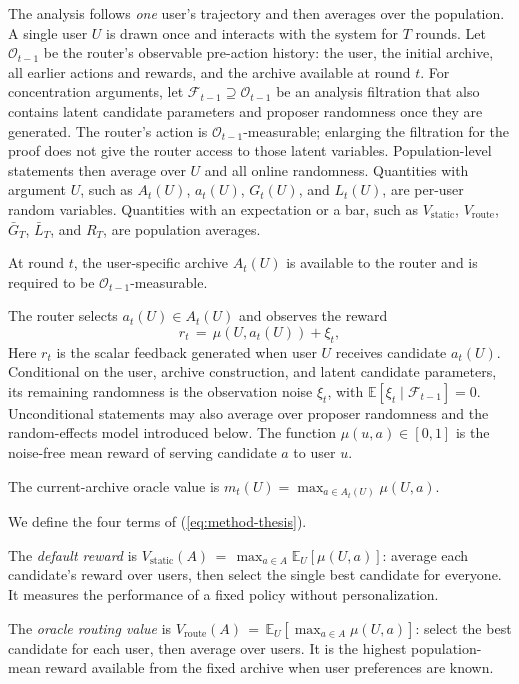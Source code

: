 \documentclass{article} %
\providecommand{\E}{\mathbb{E}}
\renewcommand{\eqref}[1]{\textup{(\ref{#1})}}
\begin{document}
The analysis follows \emph{one} user's trajectory and then averages over the population. A single user \(U\) is drawn once and interacts with the system for \(T\) rounds. Let \(\mathcal O_{t-1}\) be the router's observable pre-action history: the user, the initial archive, all earlier actions and rewards, and the archive available at round \(t\). For concentration arguments, let \(\mathcal F_{t-1}\supseteq\mathcal O_{t-1}\) be an analysis filtration that also contains latent candidate parameters and proposer randomness once they are generated. The router's action is \(\mathcal O_{t-1}\)-measurable; enlarging the filtration for the proof does not give the router access to those latent variables. Population-level statements then average over \(U\) and all online randomness. Quantities with argument \(U\), such as \(A_t(U)\), \(a_t(U)\), \(G_t(U)\), and \(L_t(U)\), are per-user random variables.  Quantities with an expectation or a bar, such as \(V_{\mathrm{static}}\), \(V_{\mathrm{route}}\), \(\bar G_T\), \(\bar L_T\), and \(R_T\), are population averages.

At round $t$, the user-specific archive $A_t(U)$ is available to the router and is required to be $\mathcal{O}_{t-1}$-measurable.

The router selects $a_t(U) \in A_t(U)$ and observes the reward
\begin{equation}
r_t \,=\, \mu(U, a_t(U)) + \xi_t ,
\end{equation}
Here \(r_t\) is the scalar feedback generated when user \(U\) receives candidate \(a_t(U)\). Conditional on the user, archive construction, and latent candidate parameters, its remaining randomness is the observation noise \(\xi_t\), with \(\E[\xi_t\mid\mathcal F_{t-1}]=0\). Unconditional statements may also average over proposer randomness and the random-effects model introduced below. The function \(\mu(u,a)\in[0,1]\) is the noise-free mean reward of serving candidate \(a\) to user \(u\).

The current-archive oracle value is $m_t(U) = \max_{a \in A_t(U)} \mu(U,a)$.

We define the four terms of \eqref{eq:method-thesis}.

The \emph{default reward} is $V_{\mathrm{static}}(A) \,=\, \max_{a \in A} \E_{U}[\mu(U,a)]$: average each candidate's reward over users, then select the single best candidate for everyone. It measures the performance of a fixed policy without personalization.

The \emph{oracle routing value} is $V_{\mathrm{route}}(A) \,=\, \E_{U}[\max_{a \in A} \mu(U,a)]$: select the best candidate for each user, then average over users. It is the highest population-mean reward available from the fixed archive when user preferences are known.
\end{document}

